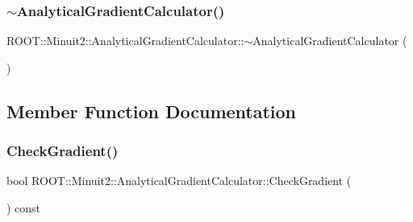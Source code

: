 \subsubsection{\texorpdfstring{$\sim$AnalyticalGradientCalculator()}{~AnalyticalGradientCalculator()}\hspace{0.1cm}{\footnotesize\ttfamily [2/2]}}
{\footnotesize\ttfamily R\+O\+O\+T\+::\+Minuit2\+::\+Analytical\+Gradient\+Calculator\+::$\sim$\+Analytical\+Gradient\+Calculator (\begin{DoxyParamCaption}{ }\end{DoxyParamCaption})\hspace{0.3cm}{\ttfamily [inline]}}



\subsection{Member Function Documentation}
\mbox{\label{classROOT_1_1Minuit2_1_1AnalyticalGradientCalculator_adee37f46da7ed30710a050462c0aa6f0}} 
\subsubsection{\texorpdfstring{CheckGradient()}{CheckGradient()}\hspace{0.1cm}{\footnotesize\ttfamily [1/2]}}
{\footnotesize\ttfamily bool R\+O\+O\+T\+::\+Minuit2\+::\+Analytical\+Gradient\+Calculator\+::\+Check\+Gradient (\begin{DoxyParamCaption}{ }\end{DoxyParamCaption}) const\hspace{0.3cm}{\ttfamily [virtual]}}

